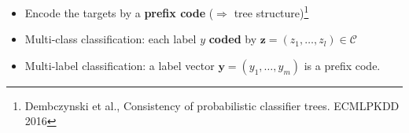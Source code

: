 \documentclass[]{beamer}
\newcommand{\by}{\boldsymbol{y}}
\newcommand{\bz}{\boldsymbol{z}}
\newcommand{\calC}{\mathcal{C}}
\renewcommand{\emph}[1]{\textbf{\color{putblue}#1}}
\begin{document}
\begin{frame}
\begin{center}
\end{center}
\begin{itemize}
\item Encode the targets by a \emph{prefix code} ($\Rightarrow$ tree structure)\footnote{ Dembczynski et al., Consistency of
probabilistic classifier trees. ECMLPKDD 2016}
\item Multi-class classification: each label $y$ \emph{coded} by $\bz = (z_1, \ldots, z_l) \in \calC$
\item Multi-label classification: a label vector $\by = (y_1, \ldots, y_m)$ is a prefix code.
\end{itemize}
\end{frame}
\end{document}
